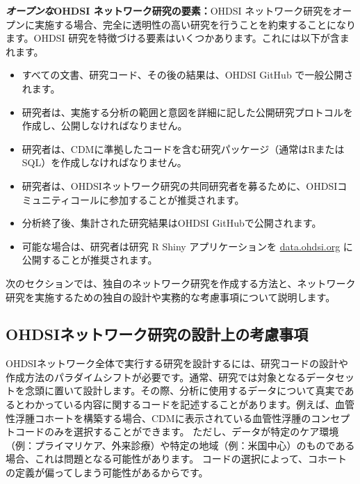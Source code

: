 \documentclass[
  11pt]{book}
\theoremstyle{definition}
\theoremstyle{definition}
\theoremstyle{definition}
\theoremstyle{definition}
\theoremstyle{remark}
\begin{document}
\textbf{\emph{オープンな}OHDSI ネットワーク研究の要素：}OHDSI ネットワーク研究をオープンに実施する場合、完全に透明性の高い研究を行うことを約束することになります。OHDSI 研究を特徴づける要素はいくつかあります。これには以下が含まれます。

\begin{itemize}
\item
  すべての文書、研究コード、その後の結果は、OHDSI GitHub で一般公開されます。
\item
  研究者は、実施する分析の範囲と意図を詳細に記した公開研究プロトコルを作成し、公開しなければなりません。
\item
  研究者は、CDMに準拠したコードを含む研究パッケージ（通常はRまたはSQL）を作成しなければなりません。
\item
  研究者は、OHDSIネットワーク研究の共同研究者を募るために、OHDSIコミュニティコールに参加することが推奨されます。
\item
  分析終了後、集計された研究結果はOHDSI GitHubで公開されます。
\item
  可能な場合は、研究者は研究 R Shiny アプリケーションを \href{http://data.ohdsi.org/}{data.ohdsi.org} に公開することが推奨されます。
\end{itemize}

次のセクションでは、独自のネットワーク研究を作成する方法と、ネットワーク研究を実施するための独自の設計や実務的な考慮事項について説明します。

\subsection{OHDSIネットワーク研究の設計上の考慮事項}\label{ohdsiux30cdux30c3ux30c8ux30efux30fcux30afux7814ux7a76ux306eux8a2dux8a08ux4e0aux306eux8003ux616eux4e8bux9805}


OHDSIネットワーク全体で実行する研究を設計するには、研究コードの設計や作成方法のパラダイムシフトが必要です。通常、研究では対象となるデータセットを念頭に置いて設計します。その際、分析に使用するデータについて真実であるとわかっている内容に関するコードを記述することがあります。例えば、血管性浮腫コホートを構築する場合、CDMに表示されている血管性浮腫のコンセプトコードのみを選択することができます。 ただし、データが特定のケア環境（例：プライマリケア、外来診療）や特定の地域（例：米国中心）のものである場合、これは問題となる可能性があります。 コードの選択によって、コホートの定義が偏ってしまう可能性があるからです。
\end{document}
